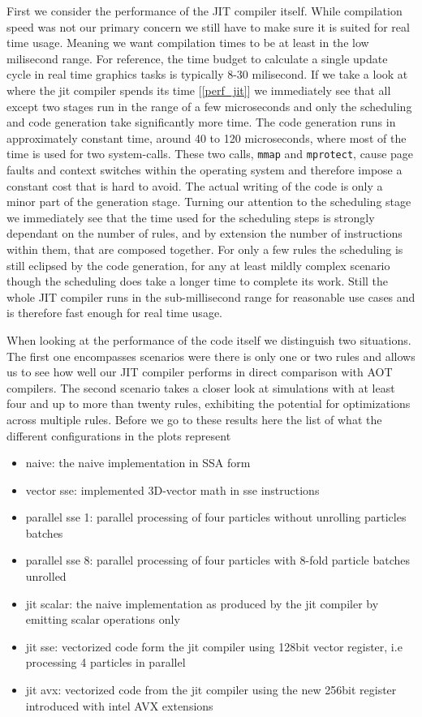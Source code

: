 First we consider the performance of the JIT compiler itself. While compilation speed was not our primary concern we still have to make sure it is suited for real time usage. Meaning we want compilation times to be at least in the low milisecond range. For reference, the time budget to calculate a single update cycle in real time graphics tasks is typically 8-30 milisecond.
If we take a look at where the jit compiler spends its time [\ref{perf_jit}] we immediately see that all except two stages run in the range of a few microseconds and only the scheduling and code generation take significantly more time. The code generation runs in approximately constant time, around 40 to 120 microseconds, where most of the time is used for two system-calls. These two calls, \texttt{mmap} and \texttt{mprotect}, cause page faults and context switches within the operating system and therefore impose a constant cost that is hard to avoid. The actual writing of the code is only a minor part of the generation stage. Turning our attention to the scheduling stage we immediately see that the time used for the scheduling steps is strongly dependant on the number of rules, and by extension the number of instructions within them, that are composed together. For only a few rules the scheduling is still eclipsed by the code generation, for any at least mildly complex scenario though the scheduling does take a longer time to complete its work. Still the whole JIT compiler runs in the sub-millisecond range for reasonable use cases and is therefore fast enough for real time usage.


When looking at the performance of the code itself we distinguish two situations. The first one encompasses scenarios were there is only one or two rules and allows us to see how well our JIT compiler performs in direct comparison with AOT compilers. The second scenario takes a closer look at simulations with at least four and up to more than twenty rules, exhibiting the potential for optimizations across multiple rules. Before we go to these results here the list of what the different configurations in the plots represent
\begin{itemize}
\item naive: the naive implementation in SSA form
\item vector sse: implemented 3D-vector math in sse instructions
\item parallel sse 1: parallel processing of four particles without unrolling particles batches
\item parallel sse 8: parallel processing of four particles with 8-fold particle batches unrolled
\item jit scalar: the naive implementation as produced by the jit compiler by emitting scalar operations only
\item jit sse: vectorized code form the jit compiler using 128bit vector register, i.e processing 4 particles in parallel
\item jit avx: vectorized code from the jit compiler using the new 256bit register introduced with intel AVX extensions
\end{itemize}

